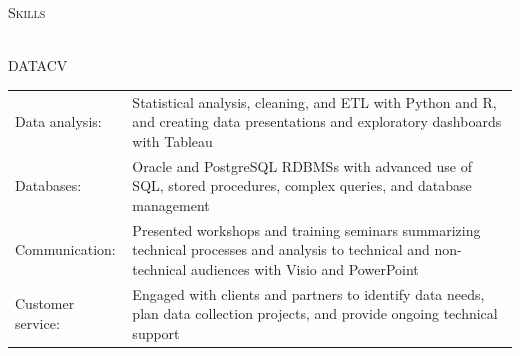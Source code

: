 \documentclass[letterpaper]{article}
\newcommand{\lineunder} {
        \vspace*{-8pt} \\
        \hspace*{-18pt} \hrulefill \\
    }
\newcommand{\header} [1] {
        \vspace{10pt}
        {\hspace*{-18pt}\vspace*{6pt} \textsc{#1}}
        \vspace*{-6pt} \lineunder
        \vspace{3pt}
    }
\newenvironment{skillslist}
        {
            \begin{tabular}[t]{ l L{5.17in} }
        }{
            \end{tabular}
        }
\begin{document}
\header{Skills}
    \begin{taggedblock}{DATACV}
        \begin{skillslist}
            Data analysis: &
                Statistical analysis, cleaning, and ETL with Python and R, 
                and creating data presentations and exploratory dashboards with
                Tableau
                \\
            Databases: & 
                Oracle and PostgreSQL RDBMSs with advanced use of SQL, stored
                procedures, complex queries, and database management
                \\
            Communication: &
                Presented workshops and training seminars summarizing technical
                processes and analysis to technical and non-technical audiences
                with Visio and PowerPoint
                \\
            Customer service: &
                Engaged with clients and partners to identify data needs, plan data
                collection projects, and provide ongoing technical support
                \\
        \end{skillslist}
    \end{taggedblock}
\end{document}
